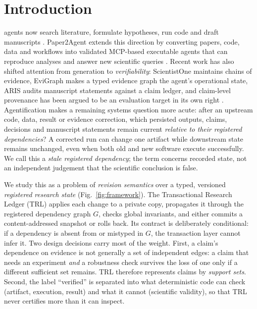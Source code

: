 \documentclass[journal]{IEEEtran}
\begin{document}
\section{Introduction}
\label{sec:intro}
 agents now search literature, formulate hypotheses, run code and draft manuscripts \cite{lu2026aiscientist,yamada2025aiscientistv2,schmidgall2025agentlab}. Paper2Agent extends this direction by converting papers, code, data and workflows into validated MCP-based executable agents that can reproduce analyses and answer new scientific queries \cite{miao2026paper2agent}. Recent work has also shifted attention from generation to \emph{verifiability}: ScientistOne maintains chains of evidence, EviGraph makes a typed evidence graph the agent's operational state, ARIS audits manuscript statements against a claim ledger, and claim-level provenance has been argued to be an evaluation target in its own right \cite{meng2026scientistone,ren2026evigraph,yang2026aris,rasheed2026auditability}. Agentification makes a remaining systems question more acute: after an upstream code, data, result or evidence correction, which persisted outputs, claims, decisions and manuscript statements remain current \emph{relative to their registered dependencies}? A corrected run can change one artifact while downstream state remains unchanged, even when both old and new software execute successfully. We call this a \emph{stale registered dependency}; the term concerns recorded state, not an independent judgement that the scientific conclusion is false.

We study this as a problem of \emph{revision semantics} over a typed, versioned \emph{registered research state} (Fig.~\ref{fig:framework}). The Transactional Research Ledger (TRL) applies each change to a private copy, propagates it through the registered dependency graph $G$, checks global invariants, and either commits a content-addressed snapshot or rolls back. Its contract is deliberately conditional: if a dependency is absent from or mistyped in $G$, the transaction layer cannot infer it. Two design decisions carry most of the weight. First, a claim's dependence on evidence is not generally a set of independent edges: a claim that needs an experiment \emph{and} a robustness check survives the loss of one only if a different sufficient set remains. TRL therefore represents claims by \emph{support sets}. Second, the label ``verified'' is separated into what deterministic code can check (artifact, execution, result) and what it cannot (scientific validity), so that TRL never certifies more than it can inspect.
\end{document}
